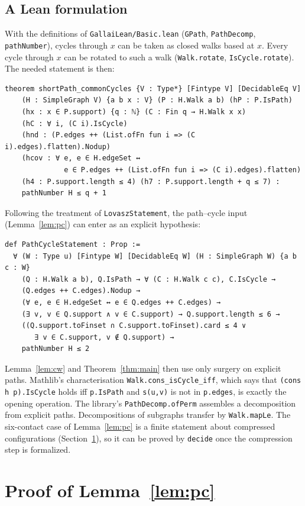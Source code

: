 \documentclass[11pt]{amsart}
\theoremstyle{definition}
\theoremstyle{remark}
\begin{document}
\subsection*{A Lean formulation}
With the definitions of \texttt{GallaiLean/Basic.lean} (\texttt{GPath}, \texttt{PathDecomp},
\texttt{pathNumber}), cycles through $x$ can be taken as closed walks based at $x$. Every cycle
through $x$ can be rotated to such a walk (\texttt{Walk.rotate}, \texttt{IsCycle.rotate}). The
needed statement is then:
\begin{verbatim}
theorem shortPath_commonCycles {V : Type*} [Fintype V] [DecidableEq V]
    (H : SimpleGraph V) {a b x : V} (P : H.Walk a b) (hP : P.IsPath)
    (hx : x ∈ P.support) {q : ℕ} (C : Fin q → H.Walk x x)
    (hC : ∀ i, (C i).IsCycle)
    (hnd : (P.edges ++ (List.ofFn fun i => (C i).edges).flatten).Nodup)
    (hcov : ∀ e, e ∈ H.edgeSet ↔
              e ∈ P.edges ++ (List.ofFn fun i => (C i).edges).flatten)
    (h4 : P.support.length ≤ 4) (h7 : P.support.length + q ≤ 7) :
    pathNumber H ≤ q + 1
\end{verbatim}
Following the treatment of \texttt{LovaszStatement}, the path--cycle input
(Lemma~\ref{lem:pc}) can enter as an explicit hypothesis:
\begin{verbatim}
def PathCycleStatement : Prop :=
  ∀ (W : Type u) [Fintype W] [DecidableEq W] (H : SimpleGraph W) {a b c : W}
    (Q : H.Walk a b), Q.IsPath → ∀ (C : H.Walk c c), C.IsCycle →
    (Q.edges ++ C.edges).Nodup →
    (∀ e, e ∈ H.edgeSet ↔ e ∈ Q.edges ++ C.edges) →
    (∃ v, v ∈ Q.support ∧ v ∈ C.support) → Q.support.length ≤ 6 →
    ((Q.support.toFinset ∩ C.support.toFinset).card ≤ 4 ∨
       ∃ v ∈ C.support, v ∉ Q.support) →
    pathNumber H ≤ 2
\end{verbatim}
Lemma~\ref{lem:cw} and Theorem~\ref{thm:main} then use only surgery on explicit paths. Mathlib's
characterisation \texttt{Walk.cons\_isCycle\_iff}, which says that \texttt{(cons h p).IsCycle} holds
iff \texttt{p.IsPath} and \texttt{s(u,v)} is not in \texttt{p.edges}, is exactly the opening
operation. The library's \texttt{PathDecomp.ofPerm} assembles a decomposition from explicit paths.
Decompositions of subgraphs transfer by \texttt{Walk.mapLe}. The six-contact case of
Lemma~\ref{lem:pc} is a finite statement about compressed configurations (Section~\ref{sec:pc}),
so it can be proved by \texttt{decide} once the compression step is formalized.

\section{Proof of Lemma~\ref{lem:pc}}\label{sec:pc}
\end{document}
